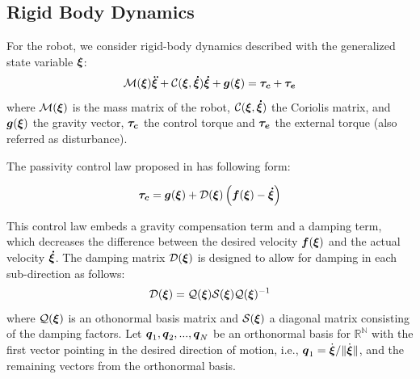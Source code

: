 \documentclass[conference]{IEEEtran}
\begin{document}
\subsection{Rigid Body Dynamics}
For the robot, we consider rigid-body dynamics described with the generalized state variable $\boldsymbol{\xi}$:
\begin{equation}
\matd{M}(\vecs\xi)\vecs{\ddot\xi} + \matd{C}(\vecs\xi, \vecs{\dot\xi})\vecs{\dot\xi} + \vect g(\vecs\xi) = \vecs{\tau_c} + \vecs{\tau_e}
 \label{eq:robot_dynamics}
\end{equation}
where $\mathcal{M}(\boldsymbol{\xi})$ is the mass matrix of the robot, $\mathcal{C}(\boldsymbol{\xi},\boldsymbol{\dot\xi})$ the Coriolis matrix, and  $\boldsymbol{g}(\boldsymbol{\xi})$ the gravity vector, $\boldsymbol{\tau_c}$ the control torque and $\boldsymbol{\tau_e}$ the external torque (also referred as disturbance).

The passivity control law proposed in \cite{kronander2015passive} has following form:

\begin{equation}
\vecs{\tau_c} = \vect g (\vecs\xi) + \matd{D}(\vecs\xi) \left(\vecs f(\vecs\xi) - \vecs{\dot\xi} \right) 
\label{eq:control_command}
\end{equation}

This control law embeds a gravity compensation term and a damping term, which decreases the difference between the desired velocity $\boldsymbol{f}(\boldsymbol{\xi})$ and the actual velocity $\boldsymbol{\dot\xi}$.
The damping matrix $\mathcal{D}(\boldsymbol{\xi})$ is designed to allow for damping in each sub-direction as follows:
\begin{equation}
  \matd {D}(\vecs \xi) = \matd{Q}(\vecs\xi)\matd{S}(\vecs\xi) \matd{Q} (\vecs \xi)^{-1}
\label{D_matrix_shaping}
\end{equation}
where $\mathcal{Q}(\boldsymbol{\xi})$ is an othonormal basis matrix and $\mathcal{S}(\boldsymbol{\xi})$ a diagonal matrix consisting of the damping factors. Let $\boldsymbol{q}_1, \boldsymbol{q}_2, ..., \boldsymbol{q}_N$ be an orthonormal basis for $\mathbb{R^N}$ with the first vector pointing in the desired direction of motion, i.e., $\boldsymbol{q}_1 = \dot{\boldsymbol{\xi}} / \lVert \dot{\boldsymbol{\xi}} \rVert$, and the remaining vectors from the orthonormal basis.
\end{document}
